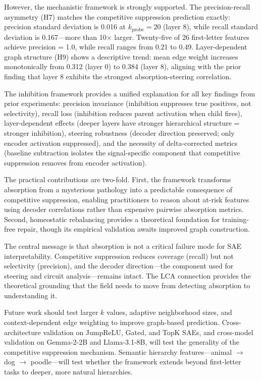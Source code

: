\documentclass{article}
\begin{document}
However, the mechanistic framework is strongly supported. The precision-recall asymmetry (H7) matches the competitive suppression prediction exactly: precision standard deviation is 0.016 at $k_{\text{probe}} = 20$ (layer 8), while recall standard deviation is 0.167---more than 10$\times$ larger. Twenty-five of 26 first-letter features achieve precision = 1.0, while recall ranges from 0.21 to 0.49. Layer-dependent graph structure (H9) shows a descriptive trend: mean edge weight increases monotonically from 0.312 (layer 0) to 0.384 (layer 8), aligning with the prior finding that layer 8 exhibits the strongest absorption-steering correlation.

The inhibition framework provides a unified explanation for all key findings from prior experiments: precision invariance (inhibition suppresses true positives, not selectivity), recall loss (inhibition reduces parent activation when child fires), layer-dependent effects (deeper layers have stronger hierarchical structure = stronger inhibition), steering robustness (decoder direction preserved; only encoder activation suppressed), and the necessity of delta-corrected metrics (baseline subtraction isolates the signal-specific component that competitive suppression removes from encoder activation).

The practical contributions are two-fold. First, the framework transforms absorption from a mysterious pathology into a predictable consequence of competitive suppression, enabling practitioners to reason about at-risk features using decoder correlations rather than expensive pairwise absorption metrics. Second, homeostatic rebalancing provides a theoretical foundation for training-free repair, though its empirical validation awaits improved graph construction.

The central message is that absorption is not a critical failure mode for SAE interpretability. Competitive suppression reduces coverage (recall) but not selectivity (precision), and the decoder direction---the component used for steering and circuit analysis---remains intact. The LCA connection provides the theoretical grounding that the field needs to move from detecting absorption to understanding it.

Future work should test larger $k$ values, adaptive neighborhood sizes, and context-dependent edge weighting to improve graph-based prediction. Cross-architecture validation on JumpReLU, Gated, and TopK SAEs, and cross-model validation on Gemma-2-2B and Llama-3.1-8B, will test the generality of the competitive suppression mechanism. Semantic hierarchy features---animal $\rightarrow$ dog $\rightarrow$ poodle---will test whether the framework extends beyond first-letter tasks to deeper, more natural hierarchies.



\end{document}
